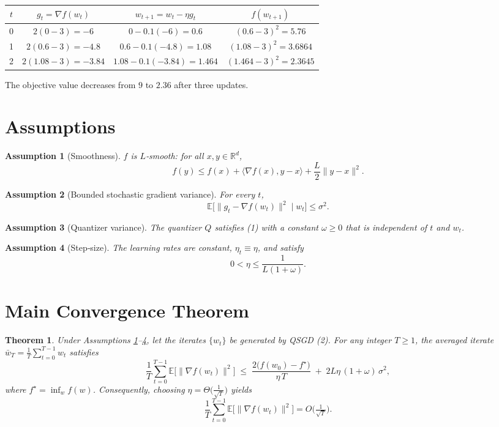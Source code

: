 \documentclass{article}
\newtheorem{theorem}{Theorem}
\newtheorem{assumption}{Assumption}
\newcommand{\E}{\mathbb{E}}
\newcommand{\R}{\mathbb{R}}
\begin{document}
\begin{center}
\begin{tabular}{c|c|c|c}
$t$ & $g_{t}= \nabla f(w_{t})$ & $w_{t+1}=w_{t}-\eta g_{t}$ & $f(w_{t+1})$ \\
\hline
0 & $2(0-3)=-6$ & $0-0.1(-6)=0.6$ & $(0.6-3)^{2}=5.76$ \\
1 & $2(0.6-3)=-4.8$ & $0.6-0.1(-4.8)=1.08$ & $(1.08-3)^{2}=3.6864$ \\
2 & $2(1.08-3)=-3.84$ & $1.08-0.1(-3.84)=1.464$ & $(1.464-3)^{2}=2.3645$ \\
\end{tabular}
\end{center}
The objective value decreases from $9$ to $2.36$ after three updates.

\newpage
\section*{Assumptions}
\begin{assumption}[Smoothness]\label{ass:smooth}
$f$ is $L$‑smooth: for all $x,y\in\R^{d}$,
\[
f(y)\le f(x)+\langle\nabla f(x),y-x\rangle+\frac{L}{2}\|y-x\|^{2}.
\tag{3}
\]
\end{assumption}
\begin{assumption}[Bounded stochastic gradient variance]\label{ass:var}
For every $t$,
\[
\E\!\big[\|g_{t}-\nabla f(w_{t})\|^{2}\mid w_{t}\big]\le\sigma^{2}.
\tag{4}
\]
\end{assumption}
\begin{assumption}[Quantizer variance]\label{ass:quant}
The quantizer $Q$ satisfies (1) with a constant $\omega\ge0$ that is
independent of $t$ and $w_{t}$.
\end{assumption}
\begin{assumption}[Step‑size]\label{ass:stepsize}
The learning rates are constant, $\eta_{t}\equiv\eta$, and satisfy
\[
0<\eta\le\frac{1}{L(1+\omega)}.
\tag{5}
\]
\end{assumption}

\section*{Main Convergence Theorem}
\begin{theorem}\label{thm:main}
Under Assumptions \ref{ass:smooth}–\ref{ass:stepsize}, let the iterates
$\{w_{t}\}$ be generated by QSGD (2).  For any integer $T\ge1$,
the averaged iterate $\bar w_{T}= \frac{1}{T}\sum_{t=0}^{T-1} w_{t}$ satisfies
\[
\boxed{
\frac{1}{T}\sum_{t=0}^{T-1}\E\!\big[\|\nabla f(w_{t})\|^{2}\big]
\;\le\;
\frac{2\big(f(w_{0})-f^{\star}\big)}{\eta\,T}
\;+\;
2L\eta\,(1+\omega)\,\sigma^{2}
},
\tag{6}
\]
where $f^{\star}\!=\!\inf_{w} f(w)$.  Consequently, choosing
$\eta = \Theta\!\big(\frac{1}{\sqrt{T}}\big)$ yields
\[
\frac{1}{T}\sum_{t=0}^{T-1}\E\!\big[\|\nabla f(w_{t})\|^{2}\big]
= O\!\big(\tfrac{1}{\sqrt{T}}\big).
\]
\end{theorem}
\end{document}
